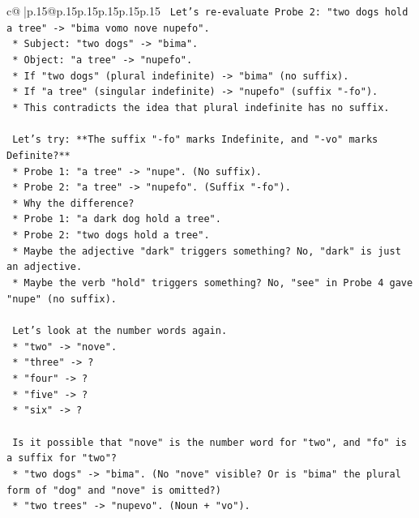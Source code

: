 \documentclass{article}
\begin{document}
{\begin{supertabular}{c@{$\;$}|p{.15\linewidth}@{}p{.15\linewidth}p{.15\linewidth}p{.15\linewidth}p{.15\linewidth}p{.15\linewidth}}
{{{\texttt{    Let's re{-}evaluate Probe 2: "two dogs hold a tree" {-}> "bima vomo nove nupefo".} \\
\texttt{    *   Subject: "two dogs" {-}> "bima".} \\
\texttt{    *   Object: "a tree" {-}> "nupefo".} \\
\texttt{    *   If "two dogs" (plural indefinite) {-}> "bima" (no suffix).} \\
\texttt{    *   If "a tree" (singular indefinite) {-}> "nupefo" (suffix "{-}fo").} \\
\texttt{    *   This contradicts the idea that plural indefinite has no suffix.} \\
\\ 
\texttt{    Let's try: **The suffix "{-}fo" marks Indefinite, and "{-}vo" marks Definite?**} \\
\texttt{    *   Probe 1: "a tree" {-}> "nupe". (No suffix).} \\
\texttt{    *   Probe 2: "a tree" {-}> "nupefo". (Suffix "{-}fo").} \\
\texttt{    *   Why the difference?} \\
\texttt{    *   Probe 1: "a dark dog hold a tree".} \\
\texttt{    *   Probe 2: "two dogs hold a tree".} \\
\texttt{    *   Maybe the adjective "dark" triggers something? No, "dark" is just an adjective.} \\
\texttt{    *   Maybe the verb "hold" triggers something? No, "see" in Probe 4 gave "nupe" (no suffix).} \\
\\ 
\texttt{    Let's look at the number words again.} \\
\texttt{    *   "two" {-}> "nove".} \\
\texttt{    *   "three" {-}> ?} \\
\texttt{    *   "four" {-}> ?} \\
\texttt{    *   "five" {-}> ?} \\
\texttt{    *   "six" {-}> ?} \\
\\ 
\texttt{    Is it possible that "nove" is the number word for "two", and "fo" is a suffix for "two"?} \\
\texttt{    *   "two dogs" {-}> "bima". (No "nove" visible? Or is "bima" the plural form of "dog" and "nove" is omitted?)} \\
\texttt{    *   "two trees" {-}> "nupevo". (Noun + "vo").} \\
}}}
\end{supertabular}}
\end{document}
